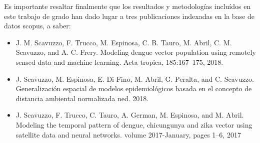   \par Es importante resaltar finalmente que los resultados y metodologías
    incluídos en este trabajo de grado han dado lugar a tres publicaciones
    indexadas en la base de datos scopus, a saber:

    \begin{itemize}
      \item J. M. Scavuzzo, F. Trucco, M. Espinosa, C. B. Tauro, M. Abril, C. M. Scavuzzo, and
      A. C. Frery. Modeling dengue vector population using remotely sensed data and machine
      learning. Acta tropica, 185:167–175, 2018. \cite{scavuzzo2018modeling}
      \item J. Scavuzzo, M. Espinosa, E. Di Fino, M. Abril, G. Peralta, and C. Scavuzzo.
      Generalización espacial de modelos epidemiológicos basada en el concepto de distancia ambiental
      normalizada ned. 2018. \cite{ned_scavuzzo}
      \item J. Scavuzzo, F. Trucco, C. Tauro, A. German, M. Espinosa, and M. Abril. Modeling
      the temporal pattern of dengue, chicungunya and zika vector using satellite data and
      neural networks. volume 2017-January, pages 1–6, 2017 \cite{scavuzzo_rpic}


    \end{itemize}
%
